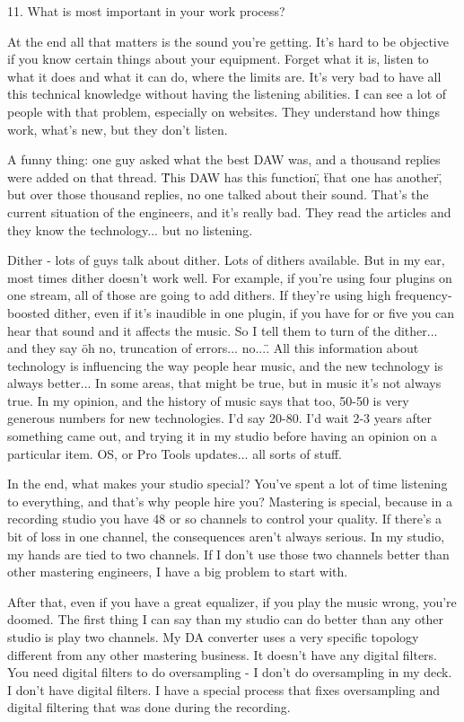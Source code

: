 11. What is most important in your work process?

At the end all that matters is the sound you're getting. It's hard to be objective if you know certain things about your equipment. Forget what it is, listen to what it does and what it can do, where the limits are. It's very bad to have all this technical knowledge without having the listening abilities. I can see a lot of people with that problem, especially on websites. They understand how things work, what's new, but they don't listen.

A funny thing: one guy asked what the best DAW was, and a thousand replies were added on that thread. \"This DAW has this function\", \"that one has another\", but over those thousand replies, no one talked about their sound. That's the current situation of the engineers, and it's really bad. They read the articles and they know the technology... but no listening.

Dither - lots of guys talk about dither. Lots of dithers available. But in my ear, most times dither doesn't work well. For example, if you're using four plugins on one stream, all of those are going to add dithers. If they're using high frequency-boosted dither, even if it's inaudible in one plugin, if you have for or five you can hear that sound and it affects the music. So I tell them to turn of the dither... and they say \"oh no, truncation of errors... no...\". All this information about technology is influencing the way people hear music, and the new technology is always better... In some areas, that might be true, but in music it's not always true. In my opinion, and the history of music says that too, 50-50 is very generous numbers for new technologies. I'd say 20-80. I'd wait 2-3 years after something came out, and trying it in my studio before having an opinion on a particular item. OS, or Pro Tools updates... all sorts of stuff.

In the end, what makes your studio special? You've spent a lot of time listening to everything, and that's why people hire you?
Mastering is special, because in a recording studio you have 48 or so channels to control your quality. If there's a bit of loss in one channel, the consequences aren't always serious. In my studio, my hands are tied to two channels. If I don't use those two channels better than other mastering engineers, I have a big problem to start with.

After that, even if you have a great equalizer, if you play the music wrong, you're doomed. The first thing I can say than my studio can do better than any other studio is play two channels. My DA converter uses a very specific topology different from any other mastering business. It doesn't have any digital filters. You need digital filters to do oversampling - I don't do oversampling in my deck. I don't have digital filters. I have a special process that fixes oversampling and digital filtering that was done during the recording.

